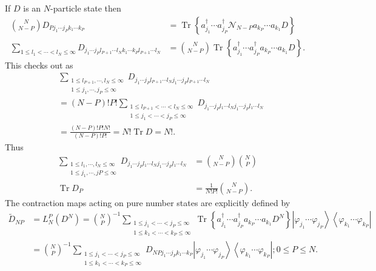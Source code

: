 \documentclass[aps,preprint]{revtex4}%
\begin{document}
If $D$ is an $N$-particle state then%
\begin{align}
\binom{N}{N-P}D_{Pj_{1}\cdots j_{P}k_{1}\cdots k_{P}}  &  =\operatorname{Tr}%
\left\{  a_{j_{1}}^{\dagger}\cdots a_{j_{P}}^{\dagger}\mathcal{N}%
_{N-P}a_{k_{P}}\cdots a_{k_{1}}D\right\} \nonumber\\
\sum_{1\leq l_{1}<\cdots<l_{N}\leq\infty}D_{j_{1}\cdots j_{P}l_{P+1}\cdots
l_{N}k_{1}\cdots k_{P}l_{P+1}\cdots l_{N}}  &  =\binom{N}{N-P}%
\operatorname{Tr}\left\{  a_{j_{1}}^{\dagger}\cdots a_{j_{P}}^{\dagger
}a_{k_{P}}\cdots a_{k_{1}}D\right\}  .
\end{align}
This checks out as%
\begin{align}
&  \sum_{\substack{1\leq l_{P+1},\cdots,l_{N}\leq\infty\\1\leq j_{1}%
,\cdots,j_{P}\leq\infty}}D_{j_{1}\cdots j_{P}l_{P+1}\cdots l_{N}j_{1}\cdots
j_{P}l_{P+1}\cdots l_{N}}\nonumber\\
&  =\left(  N-P\right)  !P!\sum_{\substack{1\leq l_{P+1}<\cdots<l_{N}%
\leq\infty\\1\leq j_{1}<\cdots<j_{P}\leq\infty}}D_{j_{1}\cdots j_{P}%
l_{1}\cdots l_{N}j_{1}\cdots j_{P}l_{1}\cdots l_{N}}\nonumber\\
&  =\frac{\left(  N-P\right)  !P!N!}{\left(  N-P\right)  !P!}%
=N!\operatorname{Tr}D=N!.
\end{align}
Thus%
\begin{align}
\sum_{\substack{1\leq l_{1},\cdots,l_{N}\leq\infty\\1\leq j_{1},\cdots
,jP\leq\infty}}D_{j_{1}\cdots j_{P}l_{1}\cdots l_{N}j_{1}\cdots j_{P}%
l_{1}\cdots l_{N}}  &  =\binom{N}{N-P}\binom{N}{P}\nonumber\\
\operatorname{Tr}D_{P}  &  =\frac{1}{N!P!}\binom{N}{N-P}.
\end{align}
The contraction maps acting on pure number states are explicitly defined by
\begin{align}
\tilde{D}_{NP}  &  =L_{N}^{P}\left(  D^{N}\right)  =\binom{N}{P}^{-1}%
\sum_{\substack{1\leq j_{1}<\cdots<j_{P}\leq\infty\\1\leq k_{1}<\cdots
<k_{P}\leq\infty}}\operatorname{Tr}\left\{  a_{j_{1}}^{\dagger}\cdots
a_{j_{P}}^{\dagger}a_{k_{P}}\cdots a_{k_{1}}D^{N}\right\}  \left\vert
\varphi_{j_{1}}\cdots\varphi_{j_{P}}\right\rangle \left\langle \varphi_{k_{1}%
}\cdots\varphi_{k_{P}}\right\vert \nonumber\\
&  =\binom{N}{P}^{-1}\sum_{\substack{1\leq j_{1}<\cdots<j_{P}\leq\infty\\1\leq
k_{1}<\cdots<k_{P}\leq\infty}}D_{NPj_{1}\cdots j_{P}k_{1}\cdots k_{P}%
}\left\vert \varphi_{j_{1}}\cdots\varphi_{j_{P}}\right\rangle \left\langle
\varphi_{k_{1}}\cdots\varphi_{k_{P}}\right\vert ;0\leq P\leq N.
\end{align}
\end{document}
